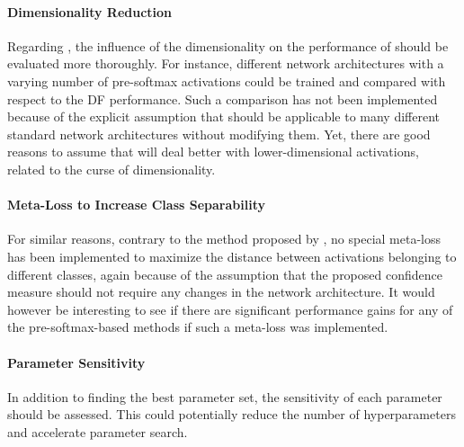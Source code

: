 \documentclass[10pt]{article}
\begin{document}
\paragraph{Dimensionality Reduction} Regarding , the influence of the dimensionality on the performance of  should be evaluated more thoroughly. For instance, different network architectures with a varying number of pre-softmax activations could be trained and compared with respect to the \acrlong{DF} performance. Such a comparison has not been implemented because of the explicit assumption that  should be applicable to many different standard network architectures without modifying them. Yet, there are good reasons to assume that  will deal better with lower-dimensional activations, related to the curse of dimensionality.

\paragraph{Meta-Loss to Increase Class Separability} For similar reasons, contrary to the method proposed by \textcite{mandelbaum17}, no special meta-loss has been implemented to maximize the distance between activations belonging to different classes, again because of the assumption that the proposed confidence measure should not require any changes in the network architecture. It would however be interesting to see if there are significant performance gains for any of the pre-softmax-based methods if such a meta-loss was implemented. 

\paragraph{Parameter Sensitivity} In addition to finding the best parameter set, the sensitivity of each parameter should be assessed. This could potentially reduce the number of hyperparameters and accelerate parameter search.

\end{document}
